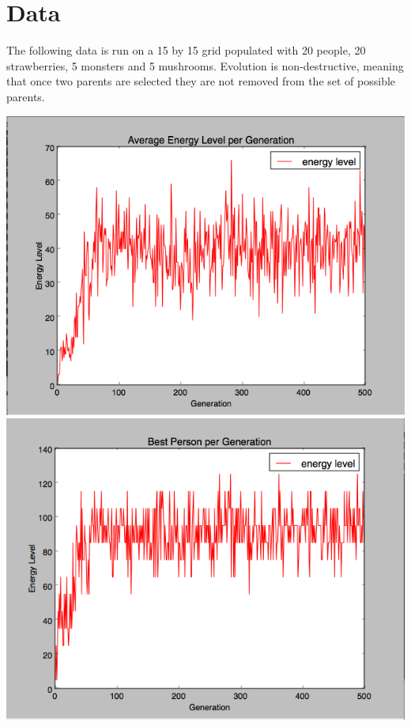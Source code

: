 \documentclass{article}
\begin{document}
 

\section{Data}

The following data is run on a 15 by 15 grid populated with 20 people, 20 strawberries, 5 monsters and 5 mushrooms.  Evolution is non-destructive, meaning that once two parents are selected they are not removed from the set of possible parents.

\includegraphics[width=1.25\textwidth]{15average_energy}
\includegraphics[width=1\textwidth]{15best_person}
\end{document}
